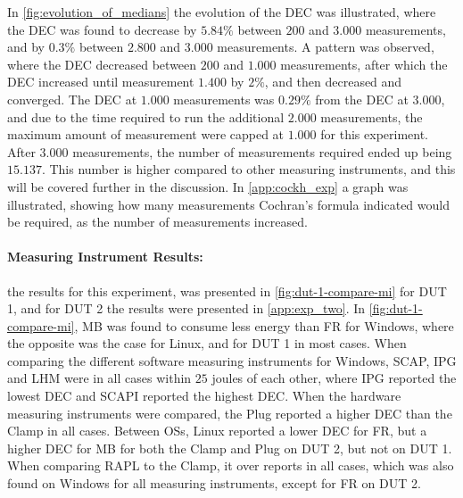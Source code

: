 In \cref{fig:evolution_of_medians} the evolution of the DEC was illustrated, where the DEC was found to decrease by $5.84\%$ between $200$ and $3.000$ measurements, and by $0.3\%$ between $2.800$ and $3.000$ measurements. A pattern was observed, where the DEC decreased between $200$ and $1.000$ measurements, after which the DEC increased until measurement $1.400$ by $2\%$, and then decreased and converged. The DEC at $1.000$ measurements was $0.29\%$ from the DEC at $3.000$, and due to the time required to run the additional $2.000$ measurements, the maximum amount of measurement were capped at $1.000$ for this experiment. After $3.000$ measurements, the number of measurements required ended up being $15.137$. This number is higher compared to other measuring instruments, and this will be covered further in the discussion. In \cref{app:cockh_exp} a graph was illustrated, showing how many measurements Cochran's formula indicated would be required, as the number of measurements increased. 




\paragraph{Measuring Instrument Results:} %
the results for this experiment, was presented in \cref{fig:dut-1-compare-mi} for DUT 1, and for DUT 2 the results were presented in \cref{app:exp_two}. In \cref{fig:dut-1-compare-mi}, MB was found to consume less energy than FR for Windows, where the opposite was the case for Linux, and for DUT 1 in most cases. When comparing the different software measuring instruments for Windows, SCAP, IPG and LHM were in all cases within $25$ joules of each other, where IPG reported the lowest DEC and SCAPI reported the highest DEC. When the hardware measuring instruments were compared, the Plug reported a higher DEC than the Clamp in all cases. Between OSs, Linux reported a lower DEC for FR, but a higher DEC for MB for both the Clamp and Plug on DUT 2, but not on DUT 1. When comparing RAPL to the Clamp, it over reports in all cases, which was also found on Windows for all measuring instruments, except for FR on DUT 2.

